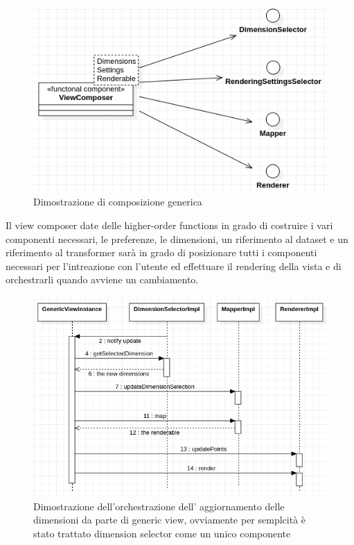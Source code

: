 \begin{figure}[h!]
  \centering
  \includegraphics[scale=0.55]{../../assets/classi_uml/comdelcomposer.png}
  \caption{Dimostrazione di composizione generica}
\end{figure}

Il view composer date delle higher-order functions in grado di costruire i vari
componenti necessari, le preferenze, le dimensioni, un riferimento al dataset e
un riferimento al transformer sarà in grado di posizionare tutti i componenti
necessari per l'intreazione con l'utente ed effettuare il rendering della vista
e di orchestrarli quando avviene un cambiamento.

\begin{figure}[h!]
  \centering
  \includegraphics[scale=0.55]{../../assets/classi_uml/interazione_gw.png}
  \caption{Dimostrazione dell'orchestrazione dell' aggiornamento delle
    dimensioni da parte di generic view, ovviamente per semplcità è stato
    trattato dimension selector come un unico componente}
\end{figure}

